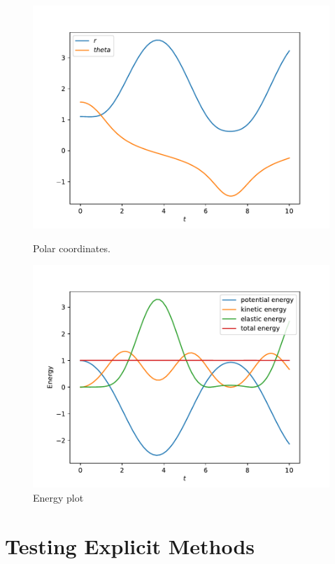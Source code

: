 \documentclass{report}
\begin{document}
\begin{figure}[h]
\centering
\begin{minipage}[b]{0.45\textwidth}
\centering
\includegraphics[width=\textwidth]{../Plots/Task4/Figure_0}
\caption{Polar coordinates.}
\label{pl:PolarPlot1}
\end{minipage}
\hfill
\begin{minipage}[b]{0.45\textwidth}
\centering
\includegraphics[width=\textwidth]{../Plots/Task4/Figure_3}
\caption{Energy plot}
\label{pl:EnergyPlot1}
\end{minipage}
\end{figure}

\section*{Testing Explicit Methods}
\end{document}
